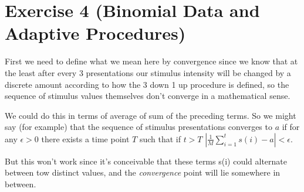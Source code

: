 \documentclass[]{article}
\begin{document}


\section{Exercise 4 (Binomial Data and Adaptive Procedures)} %
\label{sg:sec:exercise_4}

First we need to define what we mean here by convergence since we know that at the least after every 3 presentations our stimulus intensity will be changed by a discrete amount according
to how the 3 down 1 up procedure is defined, so the sequence of stimulus values themselves don't converge in a mathematical sense.

We could do this in terms of average of sum of the preceding terms. So we might say (for example) that the sequence of stimulus presentations converges to $a$ if for any  $\epsilon > 0$  there exists a time point $T$ such that if $t > T $ $|\frac{1}{M}\sum_{i=1}^{t} s(i) - a |< \epsilon$.

But this won't work since it's conceivable that these terms s(i) could alternate between tow distinct values, and the \emph{convergence} point will lie somewhere in between.


\end{document}
